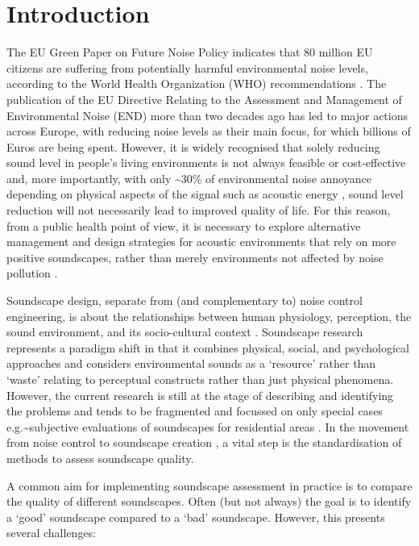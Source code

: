 \documentclass[
  authoryear,
  preprint,
  1p]{elsarticle}
\begin{document}
\section{Introduction}\label{sec-introduction}

The EU Green Paper on Future Noise Policy indicates that 80 million EU
citizens are suffering from potentially harmful environmental noise
levels, according to the World Health Organization (WHO) recommendations
\citep{Berglund1999Guidelines}. The publication of the EU Directive
Relating to the Assessment and Management of Environmental Noise (END)
\citep{EuropeanUnion2002Directive} more than two decades ago has led to
major actions across Europe, with reducing noise levels as their main
focus, for which billions of Euros are being spent. However, it is
widely recognised that solely reducing sound level in people's living
environments is not always feasible or cost-effective and, more
importantly, with only \textasciitilde30\% of environmental noise
annoyance depending on physical aspects of the signal such as acoustic
energy \citep{Guski1997Psychological}, sound level reduction will not
necessarily lead to improved quality of life. For this reason, from a
public health point of view, it is necessary to explore alternative
management and design strategies for acoustic environments that rely on
more positive soundscapes, rather than merely environments not affected
by noise pollution
\citep{Aletta2018Associations, Kang2023Soundscape, Kang2023Supportive}.

Soundscape design, separate from (and complementary to) noise control
engineering, is about the relationships between human physiology,
perception, the sound environment, and its socio-cultural context
\citep{Kang2006Urban}. Soundscape research represents a paradigm shift
in that it combines physical, social, and psychological approaches and
considers environmental sounds as a `resource' rather than `waste'
\citep{Kang2016Soundscape} relating to perceptual constructs rather than
just physical phenomena. However, the current research is still at the
stage of describing and identifying the problems and tends to be
fragmented and focussed on only special cases
e.g.\textasciitilde subjective evaluations of soundscapes for
residential areas
\citep{SchulteFortkamp2013Introduction, Chen2023Natural}. In the
movement from noise control to soundscape creation
\citep{Aletta2015Soundscape}, a vital step is the standardisation of
methods to assess soundscape quality.

A common aim for implementing soundscape assessment in practice is to
compare the quality of different soundscapes. Often (but not always) the
goal is to identify a `good' soundscape compared to a `bad' soundscape.
However, this presents several challenges:
\end{document}
